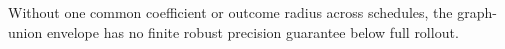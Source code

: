 Without one common coefficient or outcome radius across schedules, the graph-union envelope has no finite robust precision guarantee below full rollout.